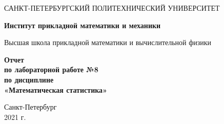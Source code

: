 \begin{titlepage}
   \begin{center}
       \vspace*{3cm}
       \large{САНКТ-ПЕТЕРБУРГСКИЙ ПОЛИТЕХНИЧЕСКИЙ УНИВЕРСИТЕТ}
       \vspace{0.4 cm}

       \large\textbf{Институт прикладной математики и механики}
       \vspace{0.4 cm}

       \large{Высшая школа прикладной математики и вычислительной физики}

       \vspace{3 cm}
       \normalsize\textbf{Отчет\\ по лабораторной работе №8\\ по дисциплине\\
«Математическая статистика»}
       \vfill

       \vspace{0.8cm}


       \normalsize{Санкт-Петербург\\2021 г.}

   \end{center}
\end{titlepage}